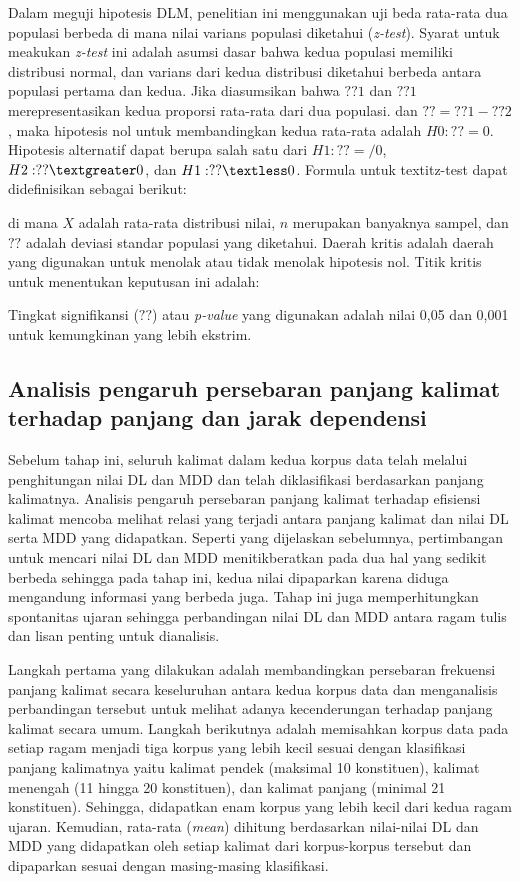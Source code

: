 Dalam meguji hipotesis DLM, penelitian ini menggunakan uji beda rata-rata dua populasi berbeda di mana nilai varians populasi diketahui (\textit{z-test}). Syarat untuk meakukan \textit{z-test} ini adalah asumsi dasar bahwa kedua populasi memiliki distribusi normal, dan varians dari kedua distribusi diketahui berbeda antara populasi pertama dan kedua. Jika diasumsikan bahwa $??1$ dan $??1$ merepresentasikan kedua proporsi rata-rata dari dua populasi. dan $??=??1-??2$, maka hipotesis nol untuk membandingkan kedua rata-rata adalah $H0:??=0$. Hipotesis alternatif dapat berupa salah satu dari $H1:??=/0$, $H2:??\textgreater0$, dan $H1:??\textless0$. Formula untuk textit{z-test} dapat didefinisikan sebagai berikut:


di mana $X$ adalah rata-rata distribusi nilai, $n$ merupakan banyaknya sampel, dan $??$ adalah deviasi standar populasi yang diketahui. Daerah kritis adalah daerah yang digunakan untuk menolak atau tidak menolak hipotesis nol. Titik kritis untuk menentukan keputusan ini adalah:


Tingkat signifikansi ($??$) atau \textit{p-value} yang digunakan adalah nilai 0,05 dan 0,001 untuk kemungkinan yang lebih ekstrim. 

\subsection{Analisis pengaruh persebaran panjang kalimat terhadap panjang dan jarak dependensi}
Sebelum tahap ini, seluruh kalimat dalam kedua korpus data telah melalui penghitungan nilai DL dan MDD dan telah diklasifikasi berdasarkan panjang kalimatnya. Analisis pengaruh persebaran panjang kalimat terhadap efisiensi kalimat mencoba melihat relasi yang terjadi antara panjang kalimat dan nilai DL serta MDD yang didapatkan. Seperti yang dijelaskan sebelumnya, pertimbangan untuk mencari nilai DL dan MDD menitikberatkan pada dua hal yang sedikit berbeda sehingga pada tahap ini, kedua nilai dipaparkan karena diduga mengandung informasi yang berbeda juga. Tahap ini juga memperhitungkan spontanitas ujaran sehingga perbandingan nilai DL dan MDD antara ragam tulis dan lisan penting untuk dianalisis. 

Langkah pertama yang dilakukan adalah membandingkan persebaran frekuensi panjang kalimat secara keseluruhan antara kedua korpus data dan menganalisis perbandingan tersebut untuk melihat adanya kecenderungan terhadap panjang kalimat secara umum. Langkah berikutnya adalah memisahkan korpus data pada setiap ragam menjadi tiga korpus yang lebih kecil sesuai dengan klasifikasi panjang kalimatnya yaitu kalimat pendek (maksimal 10 konstituen), kalimat menengah (11 hingga 20 konstituen), dan kalimat panjang (minimal 21 konstituen). Sehingga, didapatkan enam korpus yang lebih kecil dari kedua ragam ujaran. Kemudian, rata-rata (\textit{mean}) dihitung berdasarkan nilai-nilai DL dan MDD yang didapatkan oleh setiap kalimat dari korpus-korpus tersebut dan dipaparkan sesuai dengan masing-masing klasifikasi. 

